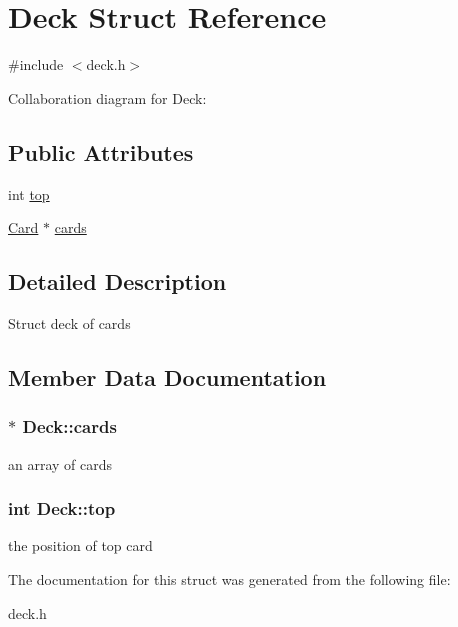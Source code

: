 \hypertarget{structDeck}{\section{Deck Struct Reference}
\label{structDeck}
}


{\ttfamily \#include $<$deck.\+h$>$}



Collaboration diagram for Deck\+:
\subsection*{Public Attributes}
\begin{DoxyCompactItemize}
\item 
int \hyperlink{structDeck_a9b480280ce1366ad9f578876e897c858}{top}
\item 
\hyperlink{structCard}{Card} $\ast$ \hyperlink{structDeck_aa5c2498afeda699034fd5feb50234092}{cards}
\end{DoxyCompactItemize}


\subsection{Detailed Description}
Struct deck of cards 

\subsection{Member Data Documentation}
\hypertarget{structDeck_aa5c2498afeda699034fd5feb50234092}{
\subsubsection[{cards}]{$\ast$ Deck\+::cards}}\label{structDeck_aa5c2498afeda699034fd5feb50234092}
an array of cards \hypertarget{structDeck_a9b480280ce1366ad9f578876e897c858}{
\subsubsection[{top}]{\setlength{\rightskip}{0pt plus 5cm}int Deck\+::top}}\label{structDeck_a9b480280ce1366ad9f578876e897c858}
the position of top card 

The documentation for this struct was generated from the following file\+:\begin{DoxyCompactItemize}
\item 
deck.\+h\end{DoxyCompactItemize}
